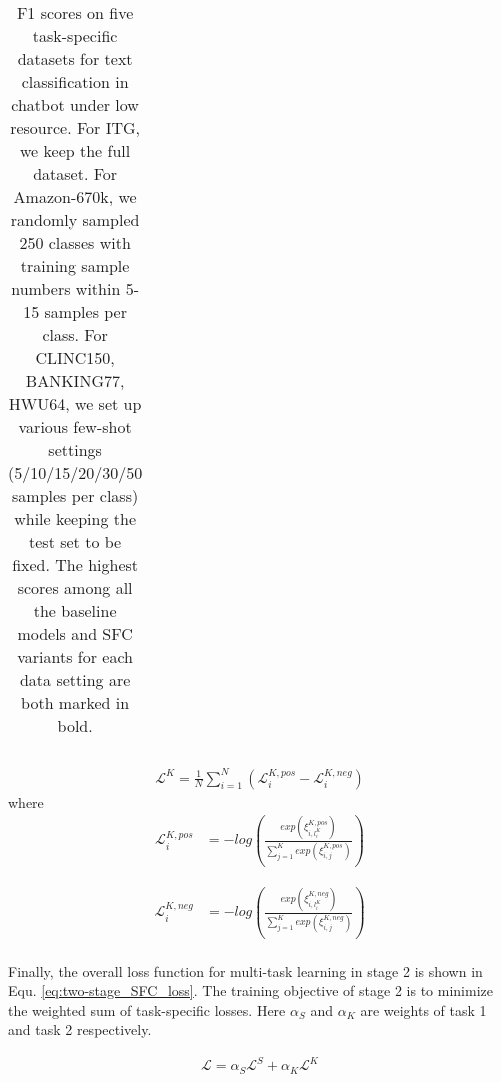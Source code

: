 \begin{table*}
\begin{centering}
{\begin{tabular}{|c|cccccc|cccccc|cccccc|c|c|}
        & & & & & & & & & & & & & & & & & & & &\tabularnewline
        \hline
      \end{tabular}
    }
    \par
  \end{centering}
  \caption{
    F1 scores on five task-specific datasets for text classification in chatbot
    under low resource. For ITG, we keep the full dataset. For Amazon-670k, we
    randomly sampled 250 classes with training sample numbers within 5-15
    samples per class. For CLINC150, BANKING77, HWU64, we set up various
    few-shot settings (5/10/15/20/30/50 samples per class) while keeping the
    test set to be fixed. The highest scores among all the baseline models and SFC variants for each data setting are both marked
    in bold.
  }
  \label{tbe:table2}
\end{table*}

\vspace{-1em}
\begin{align}
  \mathcal{L}^{K} = \frac{1}{N}\sum_{i=1}^{N}(\mathcal{L}^{K,pos}_{i} - \mathcal{L}^{K,neg}_{i})
  \label{eq:top-k_classification_loss}
\end{align}
where
\begin{equation}
  \begin{aligned}
    \mathcal{L}^{K,pos}_{i} &= -log(\frac{exp(\xi_{i,l^{K}_{i}}^{K,pos})}{\sum_{j=1}^{K}exp(\xi_{i,j}^{K,pos})})
    \label{eq: pos top-k loss}
  \end{aligned}
\end{equation}

\begin{equation}
  \begin{aligned}
    \mathcal{L}^{K,neg}_{i} &= -log(\frac{exp(\xi_{i,l^{K}_{i}}^{K,neg})}{\sum_{j=1}^{K}exp(\xi_{i,j}^{K,neg})}) \\
    \label{eq: neg top-k loss}
  \end{aligned}
\end{equation}
\vspace{-1.25em}

Finally, the overall loss function for multi-task learning in stage 2 is
shown in Equ. \ref{eq:two-stage_SFC_loss}. The training objective of stage 2 is
to minimize the weighted sum of task-specific losses. Here $\alpha_S$ and
$\alpha_K$ are weights of task 1 and task 2 respectively.

\begin{align}
  \mathcal{L} = \alpha_S \mathcal{L}^S + \alpha_K \mathcal{L}^K
  \label{eq:two-stage_SFC_loss}
\end{align}
\vspace{-2em}



